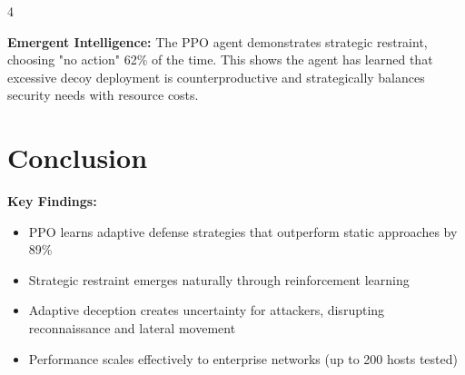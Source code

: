 \documentclass[a0,landscape]{ImperialPoster}
\begin{document}
\begin{multicols}{4}
\begin{center}
\end{center}

\textbf{Emergent Intelligence:} The PPO agent demonstrates strategic restraint, choosing "no action" 62\% of the time. This shows the agent has learned that excessive decoy deployment is counterproductive and strategically balances security needs with resource costs.

\begin{center}
\end{center}

\section{Conclusion}

\textbf{Key Findings:}
\begin{itemize}
\item PPO learns adaptive defense strategies that outperform static approaches by 89\%
\item Strategic restraint emerges naturally through reinforcement learning
\item Adaptive deception creates uncertainty for attackers, disrupting reconnaissance and lateral movement
\item Performance scales effectively to enterprise networks (up to 200 hosts tested)
\end{itemize}


\end{multicols}
\end{document}
